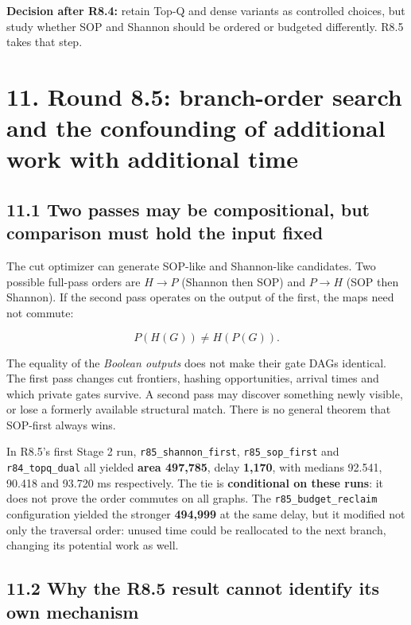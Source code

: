 \textbf{Decision after R8.4:} retain Top-Q and dense variants as controlled choices, but study whether SOP and Shannon should be ordered or budgeted differently. R8.5 takes that step.

\section{11. Round 8.5: branch-order search and the confounding of additional work with additional time}\label{round-8.5-branch-order-search-and-the-confounding-of-additional-work-with-additional-time}

\subsection{11.1 Two passes may be compositional, but comparison must hold the input fixed}\label{two-passes-may-be-compositional-but-comparison-must-hold-the-input-fixed}

The cut optimizer can generate SOP-like and Shannon-like candidates. Two possible full-pass orders are \(H\rightarrow P\) (Shannon then SOP) and \(P\rightarrow H\) (SOP then Shannon). If the second pass operates on the output of the first, the maps need not commute:

\[
P(H(G))\ne H(P(G)).
\]

The equality of the \emph{Boolean outputs} does not make their gate DAGs identical. The first pass changes cut frontiers, hashing opportunities, arrival times and which private gates survive. A second pass may discover something newly visible, or lose a formerly available structural match. There is no general theorem that SOP-first always wins.

In R8.5's first Stage 2 run, \texttt{r85\_shannon\_first}, \texttt{r85\_sop\_first} and \texttt{r84\_topq\_dual} all yielded \textbf{area 497,785}, delay \textbf{1,170}, with medians 92.541, 90.418 and 93.720 ms respectively. The tie is \textbf{conditional on these runs}: it does not prove the order commutes on all graphs. The \texttt{r85\_budget\_reclaim} configuration yielded the stronger \textbf{494,999} at the same delay, but it modified not only the traversal order: unused time could be reallocated to the next branch, changing its potential work as well.

\subsection{11.2 Why the R8.5 result cannot identify its own mechanism}\label{why-the-r8.5-result-cannot-identify-its-own-mechanism}

